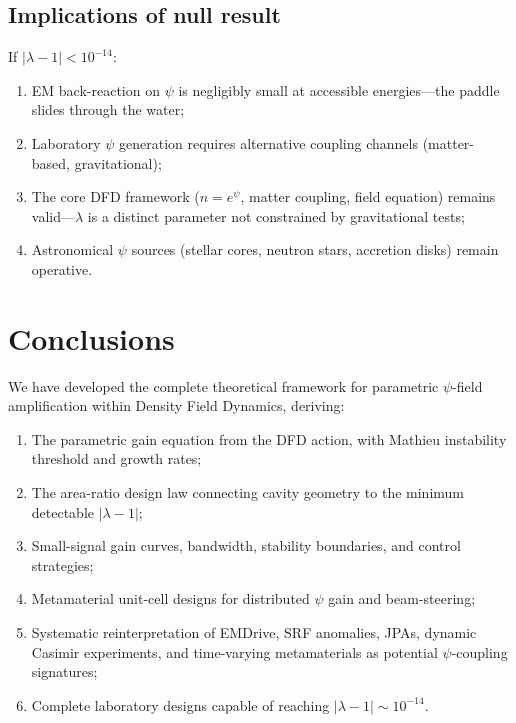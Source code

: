 \documentclass[12pt,aps,prd,twocolumn,superscriptaddress,nofootinbib]{revtex4-2}
\begin{document}
\subsection{Implications of null result}

If $|\lambda - 1| < 10^{-14}$:
\begin{enumerate}[noitemsep]
  \item EM back-reaction on $\psi$ is negligibly small at accessible
    energies---the paddle slides through the water;
  \item Laboratory $\psi$ generation requires alternative coupling
    channels (matter-based, gravitational);
  \item The core DFD framework ($n = e^\psi$, matter coupling,
    field equation) remains valid---$\lambda$ is a distinct
    parameter not constrained by gravitational tests;
  \item Astronomical $\psi$ sources (stellar cores, neutron stars,
    accretion disks) remain operative.
\end{enumerate}


\section{Conclusions}
\label{sec:conclusions}

We have developed the complete theoretical framework for parametric
$\psi$-field amplification within Density Field Dynamics, deriving:
\begin{enumerate}[noitemsep]
  \item The parametric gain equation from the DFD action, with
    Mathieu instability threshold and growth rates;
  \item The area-ratio design law connecting cavity geometry to
    the minimum detectable $|\lambda - 1|$;
  \item Small-signal gain curves, bandwidth, stability boundaries,
    and control strategies;
  \item Metamaterial unit-cell designs for distributed $\psi$ gain
    and beam-steering;
  \item Systematic reinterpretation of EMDrive, SRF anomalies,
    JPAs, dynamic Casimir experiments, and time-varying metamaterials
    as potential $\psi$-coupling signatures;
  \item Complete laboratory designs capable of reaching
    $|\lambda - 1| \sim 10^{-14}$.
\end{enumerate}
\end{document}
